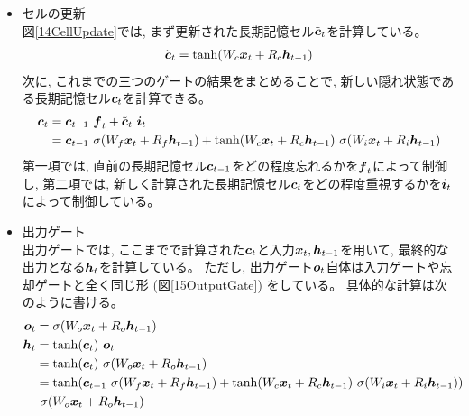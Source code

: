 \begin{itemize}
  \item セルの更新\\
  図\ref{14CellUpdate}では, まず更新された長期記憶セル$\tilde{{\mbox{\boldmath{$c$}}}}_t$を計算している。
\begin{equation}
 \begin{split}
  \tilde{{\mbox{\boldmath{$c$}}}}_t = \tanh (W_c {\mbox{\boldmath{$x$}}}_t + R_c {\mbox{\boldmath{$h$}}}_{t-1})
 \end{split}
\end{equation} 
  次に, これまでの三つのゲートの結果をまとめることで, 新しい隠れ状態である長期記憶セル${\mbox{\boldmath{$c$}}}_{t}$を計算できる。
\begin{equation}
 \begin{split}
  {\mbox{\boldmath{$c$}}}_{t} 
  &= {\mbox{\boldmath{$c$}}}_{t-1} \  {\mbox{\boldmath{$f$}}}_{t} + \tilde{\mbox{\boldmath{$c$}}}_{t}\ {\mbox{\boldmath{$i$}}}_{t}\\
  &= {\mbox{\boldmath{$c$}}}_{t-1} \  \sigma (W_f {\mbox{\boldmath{$x$}}}_t + R_f {\mbox{\boldmath{$h$}}}_{t-1}) 
  + \tanh (W_c {\mbox{\boldmath{$x$}}}_t + R_c {\mbox{\boldmath{$h$}}}_{t-1}) \  \sigma (W_i {\mbox{\boldmath{$x$}}}_t + R_i {\mbox{\boldmath{$h$}}}_{t-1})
 \end{split}
\end{equation}
  第一項では, 直前の長期記憶セル${\mbox{\boldmath{$c$}}}_{t-1}$をどの程度忘れるかを${\mbox{\boldmath{$f$}}}_{t}$によって制御し, 第二項では, 新しく計算された長期記憶セル$\tilde{\mbox{\boldmath{$c$}}}_{t}$をどの程度重視するかを${\mbox{\boldmath{$i$}}}_{t}$によって制御している。
    
  \item 出力ゲート\\
  出力ゲートでは, ここまでで計算された${\mbox{\boldmath{$c$}}}_{t}$と入力${\mbox{\boldmath{$x$}}}_t, {\mbox{\boldmath{$h$}}}_{t-1}$を用いて, 最終的な出力となる${\mbox{\boldmath{$h$}}}_{t}$を計算している。
  ただし, 出力ゲート${\mbox{\boldmath{$o$}}}_{t}$自体は入力ゲートや忘却ゲートと全く同じ形 (図\ref{15OutputGate}) をしている。
  具体的な計算は次のように書ける。
\begin{equation}
 \begin{split}
  {\mbox{\boldmath{$o$}}}_{t} 
  &= \sigma (W_o {\mbox{\boldmath{$x$}}}_t + R_o {\mbox{\boldmath{$h$}}}_{t-1})\\
  {\mbox{\boldmath{$h$}}}_{t} 
  &= \tanh({\mbox{\boldmath{$c$}}}_{t}) \  {\mbox{\boldmath{$o$}}}_{t}\\
  &= \tanh({\mbox{\boldmath{$c$}}}_{t}) \  \sigma (W_o {\mbox{\boldmath{$x$}}}_t + R_o {\mbox{\boldmath{$h$}}}_{t-1})\\
  &= \tanh({\mbox{\boldmath{$c$}}}_{t-1} \  \sigma (W_f {\mbox{\boldmath{$x$}}}_t + R_f {\mbox{\boldmath{$h$}}}_{t-1}) 
  + \tanh (W_c {\mbox{\boldmath{$x$}}}_t + R_c {\mbox{\boldmath{$h$}}}_{t-1}) \  \sigma (W_i {\mbox{\boldmath{$x$}}}_t + R_i {\mbox{\boldmath{$h$}}}_{t-1})) \\
  &\  \sigma (W_o {\mbox{\boldmath{$x$}}}_t + R_o {\mbox{\boldmath{$h$}}}_{t-1})
 \end{split}
\end{equation}
\end{itemize}

